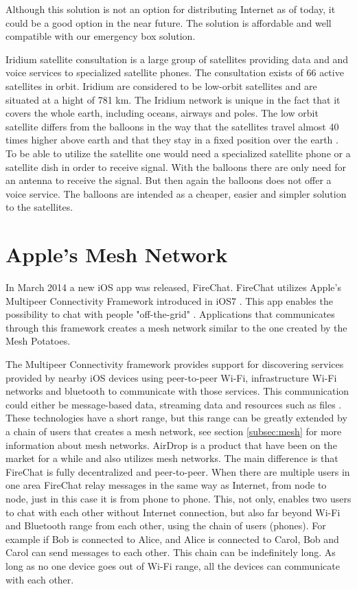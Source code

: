 Although this solution is not an option for distributing Internet as of today, it could be a good option in the near future. The solution is affordable and well compatible with our emergency box solution.

Iridium satellite consultation is a large group of satellites providing data and and voice services to specialized satellite phones. The consultation exists of 66 active satellites in orbit. Iridium are considered to be low-orbit satellites and are situated at a hight of 781 km. The Iridium network is unique in the fact that it covers the whole earth, including oceans, airways and poles. The low orbit satellite differs from the balloons in the way that the satellites travel almost 40 times higher above earth and that they stay in a fixed position over the earth \cite{iridium}. To be able to utilize the satellite one would need a specialized satellite phone or a satellite dish in order to receive signal. With the balloons there are only need for an antenna to receive the signal. But then again the balloons does not offer a voice service. The balloons are intended as a cheaper, easier and simpler solution to the satellites.                                         

\section{Apple's Mesh Network}
In March 2014 a new iOS app was released, FireChat. FireChat utilizes Apple's Multipeer Connectivity Framework introduced in iOS7 \cite{appleMesh}. This app enables the possibility to chat with people "off-the-grid" \cite{fireChat}. Applications that communicates through this framework creates a mesh network similar to the one created by the Mesh Potatoes. 

The Multipeer Connectivity framework provides support for discovering services provided by nearby iOS devices using peer-to-peer Wi-Fi, infrastructure Wi-Fi networks and bluetooth to communicate with those services. This communication could either be message-based data, streaming data and resources such as files \cite{multipeer}. These technologies have a short range, but this range can be greatly extended by a chain of users that creates a mesh network, see section \ref{subsec:mesh} for more information about mesh networks. AirDrop is a product that have been on the market for a while and also utilizes mesh networks. The main difference is that FireChat is fully decentralized and peer-to-peer. When there are multiple users in one area FireChat relay messages in the same way as Internet, from node to node, just in this case it is from phone to phone.  This, not only, enables two users to chat with each other without Internet connection, but also far beyond Wi-Fi and Bluetooth range from each other, using the chain of users (phones). For example if Bob is connected to Alice, and Alice is connected to Carol, Bob and Carol can send messages to each other. This chain can be indefinitely long. As long as no one device goes out of Wi-Fi range, all the devices can communicate with each other. 

